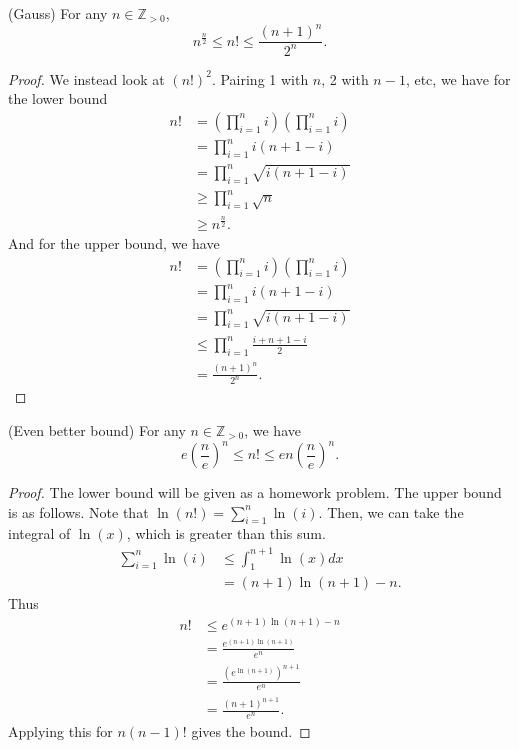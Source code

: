 \begin{theorem}
	(Gauss) For any \( n \in \mathbb{Z}_{>0} \), \[
		n^{\frac{n}{2}} \le n! \le \frac{(n+1)^{n} }{2^{n} }
	.\] 
\end{theorem}
\begin{proof}
	We instead look at \( (n!)^{2}  \). Pairing 1 with \( n \), 2 with \( n-1 \), etc, we have for the lower bound
	\begin{align*}
		n! &= \left( \prod_{i=1}^{n}i  \right) \left( \prod_{i=1}^{n}i  \right) \\
		&= \prod_{i=1}^{n}i(n + 1 - i)  \\
		&= \prod_{i=1}^{n}\sqrt{i(n+1-i)}   \\
		&\ge \prod_{i=1}^{n}\sqrt{n} \tag{Lemma 7}  \\
		&\ge n^{\frac{n}{2}} 
	.\end{align*}
	And for the upper bound, we have 
	\begin{align*}
		n! &= \left( \prod_{i=1}^{n}i  \right) \left( \prod_{i=1}^{n}i  \right) \\
		&= \prod_{i=1}^{n}i(n + 1 - i)  \\
		&= \prod_{i=1}^{n}\sqrt{i(n+1-i)}   \\
		&\le \prod_{i=1}^{n} \frac{i + n + 1 - i}{2}  \\
		&=  \frac{(n+1)^{n} }{2^{n} }
	.\end{align*}
\end{proof}

\begin{theorem}
	(Even better bound) For any \( n \in \mathbb{Z}_{>0} \), we have \[
		e \left( \frac{n}{e} \right) ^{n}  \le n! \le en \left( \frac{n}{e} \right) ^{n} 
	.\] 
\end{theorem}
\begin{proof}
	The lower bound will be given as a homework problem. The upper bound is as follows. Note that \( \ln (n!) = \sum_{i=1}^{n} \ln (i) \). Then, we can take the integral of \( \ln (x) \), which is greater than this sum.
	\begin{align*}
		\sum_{i=1}^{n} \ln (i) &\le \int_{1}^{n+1}\ln (x) dx  \\
		&= (n+1)\ln (n+1)-n
	.\end{align*}
	Thus 
	\begin{align*}
		n! &\le e^{(n+1)\ln (n+1)-n}  \\
		&= \frac{e^{(n+1)\ln (n+1)}}{e^{n} }  \\
		&= \frac{\left(e^{\ln (n+1)}\right)^{n+1}    }{e^{n} } \\
		&= \frac{\left( n+1 \right) ^{n+1}}{e^{n} } 
	.\end{align*}
	Applying this for \( n(n-1)! \) gives the bound.
\end{proof}

